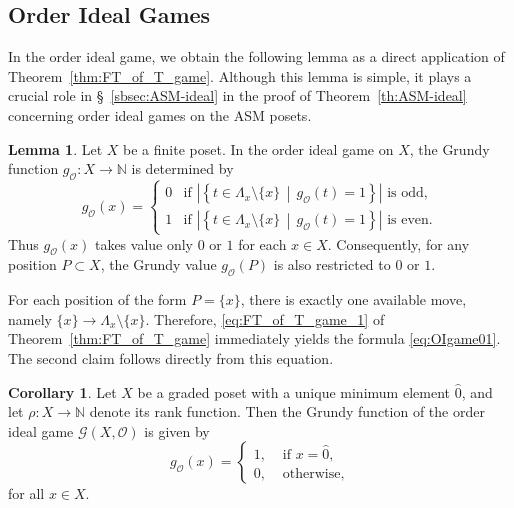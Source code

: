 \documentclass[a4paper,11pt]{amsart}
\theoremstyle{definition}
\newtheorem{lem}{Lemma}[section]
\newtheorem{cor}{Corollary}[section]
\newenvironment{demo}[1]{%
  \trivlist
  \item[\hskip\labelsep
        {\bf #1.}]
}{%
\hfill\qedsymbol
  \endtrivlist
}
\numberwithin{equation}{section}
\def\Non{\mathbb{N}}
\def\Pgame{\mathscr{G}}
\def\OI{\mathscr{O}}
\def\rkf{\rho}
\begin{document}
\subsection{Order Ideal Games}
%
\par\smallskip
%
In the order ideal game,
we obtain the following lemma as a direct application of Theorem~\ref{thm:FT_of_T_game}.
%
Although this lemma is simple, it plays a crucial role in \S~\ref{sbsec:ASM-ideal} 
in the proof of Theorem~\ref{th:ASM-ideal}
concerning order ideal games on the ASM posets.
%
\begin{lem}\label{lem:OrderI01}
	Let $X$ be a finite poset.
	In the order ideal game on $X$,
	the Grundy function
	$g_{\OI}:X \to \Non$
	is determined by
	\begin{equation}\label{eq:OIgame01}
		g_{\OI}\left( x \right)
		=
		\begin{cases}
			0	
			&	
			\textrm{if } 
			\left|
			\left\{ 
				t \in {\Lambda}_{x} \setminus \{ x \}
			\, \middle| \,
				g_{\OI}\left( t \right)
				= 
				1
			\right\}\right|
			\text{ is odd}
			, \\
			1	
			&
			\textrm{if } 
			\left|
			\left\{ 
				t \in {\Lambda}_{x} \setminus \{ x \}
			\, \middle| \,
				g_{\OI}\left( t \right)
				= 
				1
			\right\}\right|
			\text{ is even.}
		\end{cases}
	\end{equation}
	Thus $g_{\OI}\left( x \right)$ takes value only $0$ or $1$
	for each $x \in X$.
	Consequently, for any position $P \subset X$,
	the Grundy value 
	$
		g_{\OI}\left( P \right)
	$ 
	is also restricted to $0$ or $1$.
%
\end{lem}
%
\begin{demo}{Proof}
For each position of the form $P=\{ x \}$,
there is exactly one available move, namely $\{x\}\to{\Lambda}_{x} \setminus \{ x \}$.
Therefore, \eqref{eq:FT_of_T_game_1} of 
Theorem~\ref{thm:FT_of_T_game} immediately yields the formula \eqref{eq:OIgame01}.
The second claim follows directly from this equation.
\end{demo}
%
\begin{cor}\label{cor:OrderI}
%
Let $X$ be a graded poset with a unique minimum element $\hat0$,
and let $\rkf:X\to\Non$ denote its rank function.
Then the Grundy function of the order ideal game $\Pgame\left( X, \OI \right)$ is given by
\begin{equation}
g_{\OI}(x)=\begin{cases}
1,&\text{ if $x=\hat0$,}\\
0,&\text{ otherwise,}
\end{cases}
\end{equation}
for all $x\in X$.
%
\end{cor}
\end{document}
